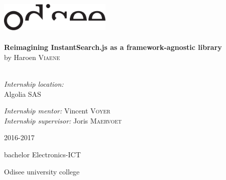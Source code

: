 \begin{titlepage}
\begin{center}
\includegraphics[width=0.4\textwidth]{./assets/logo.pdf}~\\[1cm]

\HRule \\[0.4cm]
{ \LARGE \bfseries Reimagining InstantSearch.js as a framework-agnostic \gls{library}}\\[0.4cm]
{by Haroen \textsc{Viaene}}\\[0.2cm]

\HRule \\[1.5cm]

\begin{minipage}{0.49\textwidth}
\begin{flushleft} \large
\emph{Internship location:}\\
Algolia SAS\\

\end{flushleft}
\end{minipage}
\begin{minipage}{0.49\textwidth}
\begin{flushright} \large
\emph{Internship mentor:}
Vincent \textsc{Voyer}\\
\emph{Internship supervisor:}
Joris \textsc{Maervoet}\\
\end{flushright}
\end{minipage}

\vfill

{\large 2016-2017}

{\large{bachelor Electronics-ICT}}

{\large Odisee university college}

\end{center}
\end{titlepage}
